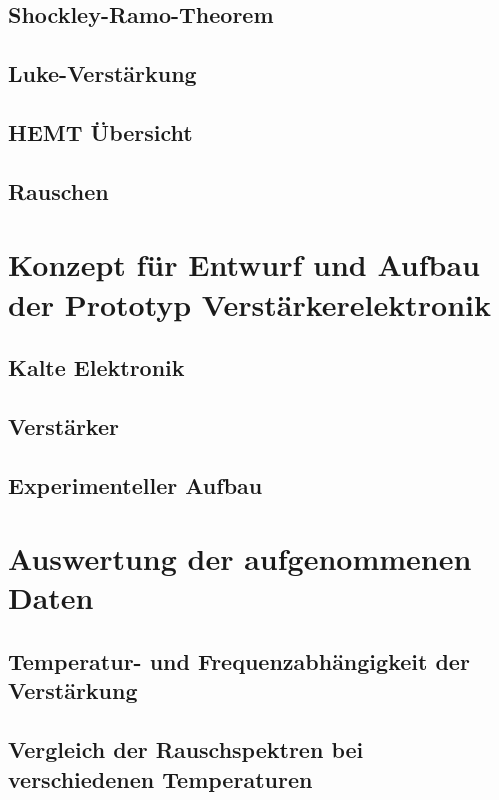 \documentclass{include/thesisclass}
\begin{document}
	\section{Shockley-Ramo-Theorem}\label{sec:Ramo}
	
	\section{Luke-Verstärkung}\label{sec:LukeAmp}
	
	\section{HEMT Übersicht}
	
	\section{Rauschen}\label{sec:Rauschen}
	
	
	\chapter{Konzept für Entwurf und Aufbau der Prototyp Verstärkerelektronik}\label{sec:Elektronik}
	
	\section{Kalte Elektronik}\label{sec:Ausleseelektronik}
	
	\section{Verstärker}\label{sec:Amp}
	
	\section{Experimenteller Aufbau}
	

    \chapter{Auswertung der aufgenommenen Daten}
    
    \section{Temperatur- und Frequenzabhängigkeit der Verstärkung}\label{sec:AuswertungAmp}
    
    \section{Vergleich der Rauschspektren bei verschiedenen Temperaturen}
    
\end{document}

